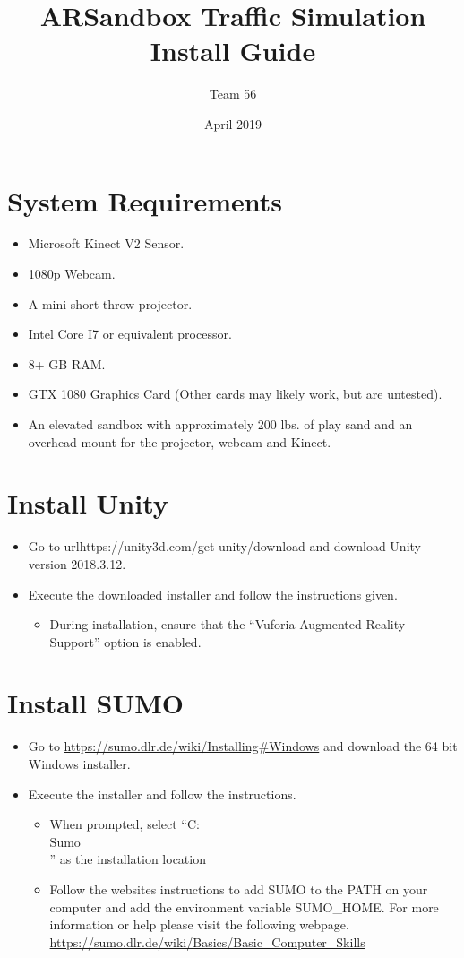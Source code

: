 \documentclass{article}
\title{ARSandbox Traffic Simulation Install Guide}
\author{Team 56}
\date{April 2019}
\begin{document}
\maketitle

\section{System Requirements}
    \begin{itemize}
        \item Microsoft Kinect V2 Sensor.
        \item 1080p Webcam.
        \item A mini short-throw projector.
        \item Intel Core I7 or equivalent processor.
        \item 8+ GB RAM.
        \item GTX 1080 Graphics Card (Other cards may likely work, but are untested).
        \item An elevated sandbox with approximately 200 lbs. of play sand and an overhead mount for the projector, webcam and Kinect. 
    \end{itemize}
    
\section{Install Unity}
\begin{itemize}
    \item Go to url{https://unity3d.com/get-unity/download} and download Unity version 2018.3.12.
    \item Execute the downloaded installer and follow the instructions given.
    \begin{itemize}
        \item During installation, ensure that the “Vuforia Augmented Reality Support” option is enabled.
    \end{itemize}
\end{itemize}

\section{Install SUMO}
\begin{itemize}
    \item Go to \url{https://sumo.dlr.de/wiki/Installing#Windows} and download the 64 bit Windows installer.
    \item Execute the installer and follow the instructions.
    \begin{itemize}
        \item When prompted, select “C:\\Sumo\\” as the installation location
        \item Follow the websites instructions to add SUMO to the PATH on your computer and add the environment variable SUMO\_HOME. For more information or help please visit the following webpage. \url{https://sumo.dlr.de/wiki/Basics/Basic_Computer_Skills}
    \end{itemize}
    
\end{itemize}
\end{document}
